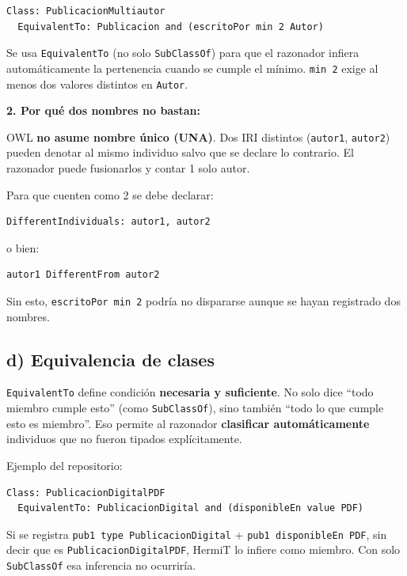 \begin{verbatim}
Class: PublicacionMultiautor
  EquivalentTo: Publicacion and (escritoPor min 2 Autor)
\end{verbatim}

Se usa \texttt{EquivalentTo} (no solo \texttt{SubClassOf}) para que el
razonador infiera automáticamente la pertenencia cuando se cumple el
mínimo. \texttt{min\ 2} exige al menos dos valores distintos en
\texttt{Autor}.

\textbf{2. Por qué dos nombres no bastan:}

OWL \textbf{no asume nombre único (UNA)}. Dos IRI distintos
(\texttt{autor1}, \texttt{autor2}) pueden denotar al mismo individuo
salvo que se declare lo contrario. El razonador puede fusionarlos y
contar 1 solo autor.

Para que cuenten como 2 se debe declarar:

\begin{verbatim}
DifferentIndividuals: autor1, autor2
\end{verbatim}

o bien:

\begin{verbatim}
autor1 DifferentFrom autor2
\end{verbatim}

Sin esto, \texttt{escritoPor\ min\ 2} podría no dispararse aunque se
hayan registrado dos nombres.

\subsection{d) Equivalencia de clases}\label{d-equivalencia-de-clases}

\texttt{EquivalentTo} define condición \textbf{necesaria y suficiente}.
No solo dice ``todo miembro cumple esto'' (como \texttt{SubClassOf}),
sino también ``todo lo que cumple esto es miembro''. Eso permite al
razonador \textbf{clasificar automáticamente} individuos que no fueron
tipados explícitamente.

Ejemplo del repositorio:

\begin{verbatim}
Class: PublicacionDigitalPDF
  EquivalentTo: PublicacionDigital and (disponibleEn value PDF)
\end{verbatim}

Si se registra \texttt{pub1\ type\ PublicacionDigital} +
\texttt{pub1\ disponibleEn\ PDF}, sin decir que es
\texttt{PublicacionDigitalPDF}, HermiT lo infiere como miembro. Con solo
\texttt{SubClassOf} esa inferencia no ocurriría.

